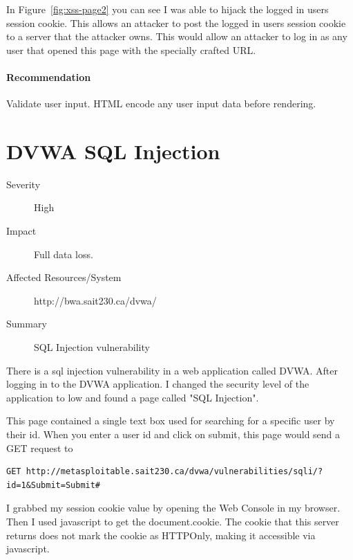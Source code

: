 \documentclass{article}
\begin{document}
In Figure~\ref{fig:xss-page2} you can see I was able to hijack the logged
in users session cookie. This allows an attacker to post the logged in
users session cookie to a server that the attacker owns. This would allow
an attacker to log in as any user that opened this page with the specially
crafted URL.

\paragraph{Recommendation}

Validate user input. HTML encode any user input data before rendering.

\newpage
\section{DVWA SQL Injection}

\begin{description}
  \item[Severity] High
  \item[Impact] Full data loss.
  \item[Affected Resources/System] http://bwa.sait230.ca/dvwa/
  \item[Summary] SQL Injection vulnerability
\end{description}

There is a sql injection vulnerability in a web application called DVWA\@.
After logging in to the DVWA application. I changed the security level of the application to low
and found a page called "SQL Injection".

This page contained a single text box used for searching for a specific user by their id.
When you enter a user id and click on submit, this page would send a GET request to 

\begin{lstlisting}[basicstyle=\tiny]
GET http://metasploitable.sait230.ca/dvwa/vulnerabilities/sqli/?id=1&Submit=Submit#
\end{lstlisting}

I grabbed my session cookie value by opening the Web Console in my browser.
Then I used javascript to get the document.cookie. The cookie that this server
returns does not mark the cookie as HTTPOnly, making it accessible via javascript.
\end{document}
